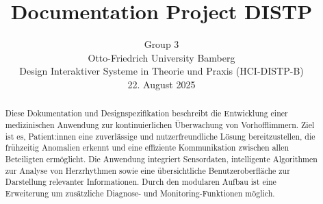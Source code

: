 \documentclass{article}
\title{Documentation Project DISTP}
\author{%
  Group 3 \\
  Otto-Friedrich University Bamberg\\
  Design Interaktiver Systeme in Theorie und Praxis (HCI-DISTP-B) \\ 
  22. August 2025 \\
}
\begin{document}
\maketitle

\begin{abstract}
Diese Dokumentation und Designspezifikation beschreibt die Entwicklung einer medizinischen Anwendung zur kontinuierlichen Überwachung von Vorhofflimmern. Ziel ist es, Patient:innen eine zuverlässige und nutzerfreundliche Lösung bereitzustellen, die frühzeitig Anomalien erkennt und eine effiziente Kommunikation zwischen allen Beteiligten ermöglicht. Die Anwendung integriert Sensordaten, intelligente Algorithmen zur Analyse von Herzrhythmen sowie eine übersichtliche Benutzeroberfläche zur Darstellung relevanter Informationen. Durch den modularen Aufbau ist eine Erweiterung um zusätzliche Diagnose- und Monitoring-Funktionen möglich.
\end{abstract}










\end{document}
